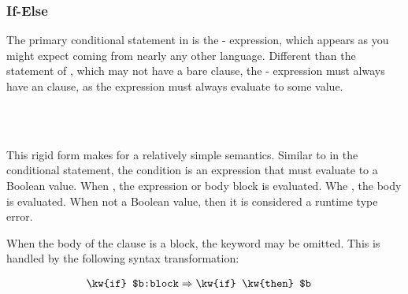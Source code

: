 \subsubsection{If-Else}
\label{sec:if-else}

The primary conditional statement in \Trilogy{} is the - expression,
which appears as you might expect coming from nearly any other language.
Different than the  statement of \Prose{}, which may not have a bare
 clause, the - expression must always have an 
clause, as the expression must always evaluate to some value.

\begin{bnf*}
     \\
     \\
\end{bnf*}

This rigid form makes for a relatively simple semantics. Similar to in the
conditional statement, the condition is an expression that must evaluate
to a Boolean value. When , the  expression or body block
is evaluated. Whe , the  body is evaluated. When not a
Boolean value, then it is considered a runtime type error.

\begin{prooftree}
\end{prooftree}

\begin{prooftree}
\end{prooftree}

When the body of the  clause is a block, the  keyword may be
omitted. This is handled by the following syntax transformation:

\begin{align*}
    \texttt{\kw{if} \$b:block} & \Rightarrow \texttt{\kw{if} \kw{then} \$b}
\end{align*}
